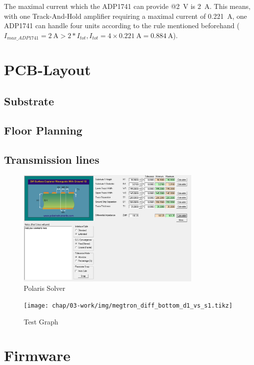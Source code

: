 The maximal current which the ADP1741 can provide @\SI{2}{\volt} is \SI{2}{\ampere}. This means, with one Track-And-Hold amplifier requiring a maximal current of \SI{0.221}{\ampere}, one ADP1741 can handle four units according to the rule mentioned beforehand ($I_{max\_ADP1741} = \SI{2}{\ampere} > 2 * I_{tot}, I_{tot} = 4 \times \SI{0.221}{\ampere} =  \SI{0.884}{\ampere}$).



\newpage
\section{PCB-Layout}
\subsection{Substrate}
\subsection{Floor Planning}
\subsection{Transmission lines}

\begin{figure}[H]
	\centering
	\includegraphics[width = 0.8\textwidth]{chap/03-work/img/polaris}
	\caption{Polaris Solver}
	\label{fig:polaris}
\end{figure}

\begin{figure}[H]
	\centering
	\texttt{[image: chap/03-work/img/megtron\_diff\_bottom\_d1\_vs\_s1.tikz]}
	\caption{Test Graph}
	\label{fig:megtron}
\end{figure}

  
\newpage
\section{Firmware}
